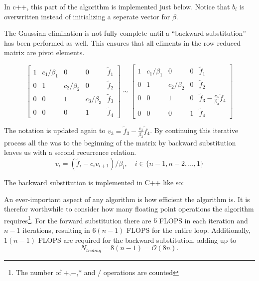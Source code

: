 \documentclass[10pt, a4paper]{amsart}
\begin{document}
In c++, this part of the algorithm is implemented just below. Notice
that $b_i$ is overwritten instead of initializing a seperate vector
for $\beta$. 


The Gaussian elimination is not fully complete until a ``backward
substitution'' has been performed as well. This ensures that all
eliments in the row reduced matrix are pivot elements. 

\begin{equation}
\left[
\begin{array}{cccc|c}
1 & c_1/\beta_1 & 0 & 0 & \tilde{f}_1 \\
0 & 1 & c_2/\beta_2 & 0  & \tilde{f}_2 \\
0 & 0 & 1 & c_3/\beta_3 & \tilde{f}_3 \\
0 & 0 & 0 & 1 & \tilde{f}_4
\end{array}
\right] \sim
\left[
\begin{array}{cccc|c}
1 & c_1/\beta_1 & 0 & 0 & \tilde{f}_1 \\
0 & 1 & c_2/\beta_2 & 0  & \tilde{f}_2 \\
0 & 0 & 1 & 0 & \tilde{f}_3 -\frac{c_3}{\beta_3}\tilde{f}_4 \\
0 & 0 & 0 & 1 & \tilde{f}_4
\end{array}
\right]
\end{equation}

The notation is updated again to $v_3 =\tilde{f}_3 -
\frac{c_3}{\beta_3}\tilde{f}_4$. By continuing this iterative process
all the was to the beginning of the matrix by backward substitution
leaves us with a second recurrence relation.
\begin{equation}
\label{eq:backward1}
v_i=(\tilde{f}_i - c_iv_{i+1})/\beta_i, \quad i \in \{n-1,n-2,\dots,1\}
\end{equation}

The backward substitution is implemented in C++ like so:


An ever-important aspect of any algorithm is how efficient the algorithm is. It
is therefor worthwhile to consider how many floating point operations
the algorithm requires\footnote{The number of $+$,$-$,$*$ and $/$
  operations are counted}. For the forward substitution there are $6$
FLOPS in each iteration and $n-1$ iterations, resulting in $6(n-1)$
FLOPS for the entire loop. Additionally, $1(n-1)$ FLOPS are required
for the backward substitution, adding up to 
\begin{equation}
N_{tridiag}=8(n-1)=\mathcal{O} (8n).
\end{equation}
\end{document}
